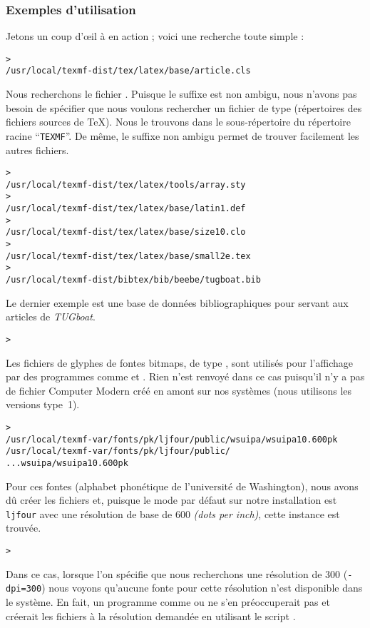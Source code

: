 \documentclass[german, english, french]{article}
\renewcommand{\samp}[1]{\enquote{\texttt{#1}}}
\begin{document}
\subsubsection{Exemples d'utilisation}
\label{sec:examples-of-use}

Jetons un coup d'œil à \KPS{} en action ; voici une recherche toute simple :

\begin{alltt}
> 
/usr/local/texmf-dist/tex/latex/base/article.cls
\end{alltt}
Nous recherchons le fichier . Puisque le suffixe 
est non ambigu, nous n'avons pas besoin de spécifier que nous voulons rechercher
un fichier de type  (répertoires des fichiers sources de
\TeX{}). Nous le trouvons dans le sous-répertoire  du
répertoire racine \samp{TEXMF}.  De même, le suffixe non ambigu permet de
trouver facilement les autres fichiers.
\begin{alltt}
> 
   /usr/local/texmf-dist/tex/latex/tools/array.sty
> 
   /usr/local/texmf-dist/tex/latex/base/latin1.def
> 
   /usr/local/texmf-dist/tex/latex/base/size10.clo
> 
   /usr/local/texmf-dist/tex/latex/base/small2e.tex
> 
   /usr/local/texmf-dist/bibtex/bib/beebe/tugboat.bib
\end{alltt}

Le dernier exemple est une base de données bibliographiques pour \BibTeX{}
servant aux articles de \textsl{TUGboat}.

\begin{alltt}
> 
\end{alltt}
Les fichiers de glyphes de fontes bitmaps, de type , sont utilisés
pour l'affichage par des programmes comme  et .
Rien n'est renvoyé dans ce cas puisqu'il n'y a pas de fichier Computer Modern
 créé en amont sur nos systèmes (nous utilisons les versions type~1).
\begin{alltt}
> 
\ifSingleColumn
  /usr/local/texmf-var/fonts/pk/ljfour/public/wsuipa/wsuipa10.600pk
\else /usr/local/texmf-var/fonts/pk/ljfour/public/
...                         wsuipa/wsuipa10.600pk
\fi\end{alltt}
Pour ces fontes (alphabet phonétique de l'université de Washington),
nous avons dû créer les fichiers  et, puisque le mode \MF{} par
défaut sur notre installation est \texttt{ljfour} avec une résolution de
base de 600\dpi{} \textit{(dots per inch)}, cette instance est trouvée.
\begin{alltt}
> 
\end{alltt}
Dans ce cas, lorsque l'on spécifie que nous recherchons une résolution de
300\dpi{} (\texttt{-dpi=300}) nous voyons qu'aucune fonte pour cette résolution
n'est disponible dans le système. En fait, un programme comme  ou
 ne s'en préoccuperait pas et créerait les fichiers 
à la résolution demandée en utilisant le script .
\end{document}
